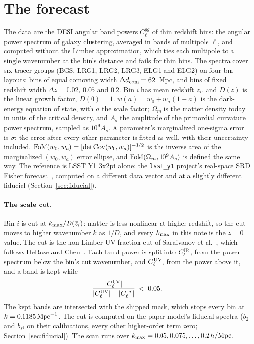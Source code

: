 \documentclass[11pt]{article}
\newcommand{\kmax}{k_{\rm max}}
\newcommand{\hMpc}{\,h/{\rm Mpc}}
\newcommand{\bstwo}{b_{s^2}}
\begin{document}
\section{The forecast}
\label{sec:forecast}

The data are the DESI angular band powers $C_\ell^{gg}$ of thin
redshift bins: the angular power spectrum of galaxy clustering,
averaged in bands of multipole $\ell$, and computed without the Limber
approximation, which ties each multipole to a single wavenumber at the
bin's distance and fails for thin bins.  The spectra cover six
tracer groups (BGS, LRG1, LRG2, LRG3, ELG1 and ELG2) on four bin
layouts: bins of equal comoving width $\Delta d_{\rm com} = 62$~Mpc,
and bins of fixed redshift width $\Delta z = 0.02$, $0.05$ and $0.2$.
Bin $i$ has mean redshift $\bar{z}_i$, and $D(z)$ is the linear growth
factor, $D(0) = 1$.  $w(a) = w_0 + w_a(1 - a)$ is the dark-energy
equation of state, with $a$ the scale factor; $\Omega_m$ is the matter
density today in units of the critical density, and $A_s$ the
amplitude of the primordial curvature power spectrum, sampled as
$10^9 A_s$.  A parameter's marginalized one-sigma error is $\sigma$:
the error after every other parameter is fitted as well, with their
uncertainty included.
${\rm FoM}(w_0, w_a) = [\det \mathrm{Cov}(w_0, w_a)]^{-1/2}$ is the
inverse area of the marginalized $(w_0, w_a)$ error ellipse, and
${\rm FoM}(\Omega_m, 10^9 A_s)$ is defined the same way.  The
reference is LSST Y1 3x2pt alone: the \texttt{lsst\_y1} project's
real-space SRD Fisher forecast~\cite{DESCSRD2018}, computed on a
different data vector and at a slightly different fiducial
(Section~\ref{sec:fiducial}).

\paragraph{The scale cut.}
Bin $i$ is cut at $\kmax/D(\bar{z}_i)$: matter is less nonlinear at
higher redshift, so the cut moves to higher wavenumber $k$ as $1/D$,
and every $\kmax$ in this note is the $z = 0$ value.  The cut is the
non-Limber UV-fraction cut of Saraivanov et al.~\cite{Saraivanov2026},
which follows DeRose and Chen~\cite{DeRoseChen2025}.  Each band power
is split into $C_\ell^{\rm IR}$, from the power spectrum below the
bin's cut wavenumber, and $C_\ell^{\rm UV}$, from the power above it,
and a band is kept while
\begin{equation}
  \frac{|C_\ell^{\rm UV}|}{|C_\ell^{\rm UV}| + |C_\ell^{\rm IR}|}
  \;<\; 0.05 .
  \label{eq:uvfraction}
\end{equation}
The kept bands are intersected with the shipped mask, which stops
every bin at $k = 0.1185\,{\rm Mpc}^{-1}$.  The cut is computed on the
paper model's fiducial spectra ($b_2$ and $\bstwo$ on their
calibrations, every other higher-order term zero;
Section~\ref{sec:fiducial}).  The scan runs over
$\kmax = 0.05, 0.075, \ldots, 0.2\hMpc$.
\end{document}
